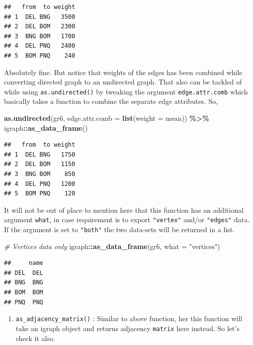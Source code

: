\documentclass[
]{book}
\newenvironment{Shaded}{\begin{snugshade}}{\end{snugshade}}
\newcommand{\AttributeTok}[1]{\textcolor[rgb]{0.13,0.29,0.53}{#1}}
\newcommand{\CommentTok}[1]{\textcolor[rgb]{0.56,0.35,0.01}{\textit{#1}}}
\newcommand{\FunctionTok}[1]{\textcolor[rgb]{0.13,0.29,0.53}{\textbf{#1}}}
\newcommand{\NormalTok}[1]{#1}
\newcommand{\SpecialCharTok}[1]{\textcolor[rgb]{0.81,0.36,0.00}{\textbf{#1}}}
\newcommand{\StringTok}[1]{\textcolor[rgb]{0.31,0.60,0.02}{#1}}
\providecommand{\tightlist}{%
  \setlength{\itemsep}{0pt}\setlength{\parskip}{0pt}}
\begin{document}
\begin{verbatim}
##   from  to weight
## 1  DEL BNG   3500
## 2  DEL BOM   2300
## 3  BNG BOM   1700
## 4  DEL PNQ   2400
## 5  BOM PNQ    240
\end{verbatim}

Absolutely fine. But notice that weights of the edges has been combined while converting directed graph to an undirected graph. That also can be tackled of while using \texttt{as.undirected()} by tweaking the argument \texttt{edge.attr.comb} which basically takes a function to combine the separate edge attributes. So,

\begin{Shaded}
\begin{Highlighting}[]
\FunctionTok{as.undirected}\NormalTok{(gr6, }\AttributeTok{edge.attr.comb =} \FunctionTok{list}\NormalTok{(}\AttributeTok{weight =}\NormalTok{ mean)) }\SpecialCharTok{\%\textgreater{}\%}
\NormalTok{  igraph}\SpecialCharTok{::}\FunctionTok{as\_data\_frame}\NormalTok{()}
\end{Highlighting}
\end{Shaded}

\begin{verbatim}
##   from  to weight
## 1  DEL BNG   1750
## 2  DEL BOM   1150
## 3  BNG BOM    850
## 4  DEL PNQ   1200
## 5  BOM PNQ    120
\end{verbatim}

It will not be out of place to mention here that this function has an additional argument \texttt{what}, in case requirement is to export \texttt{"vertex"} and/or \texttt{"edges"} data. If the argument is set to \texttt{"both"} the two data-sets will be returned in a list.

\begin{Shaded}
\begin{Highlighting}[]
\CommentTok{\# Vertices data only}
\NormalTok{igraph}\SpecialCharTok{::}\FunctionTok{as\_data\_frame}\NormalTok{(gr6, }\AttributeTok{what =} \StringTok{"vertices"}\NormalTok{)}
\end{Highlighting}
\end{Shaded}

\begin{verbatim}
##     name
## DEL  DEL
## BNG  BNG
## BOM  BOM
## PNQ  PNQ
\end{verbatim}

\begin{enumerate}
\def\labelenumi{\arabic{enumi}.}
\setcounter{enumi}{1}
\tightlist
\item
  \texttt{as\_adjacency\_matrix()} : Similar to above function, her this function will take an igraph object and returns adjacency \texttt{matrix} here instead. So let's check it also.
\end{enumerate}
\end{document}
